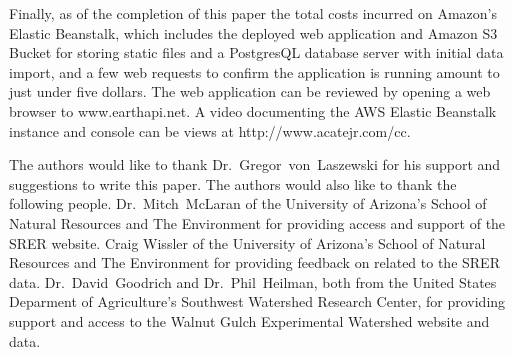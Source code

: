 Finally, as of the completion of this paper the total costs incurred on 
Amazon's Elastic Beanstalk, which includes the deployed web application 
and Amazon S3 Bucket for storing static files and a PostgresQL database 
server with initial data import, and a few web requests to confirm the 
application is running amount to just under five dollars.  The web 
application can be reviewed by opening a web browser to www.earthapi.net.  
A video documenting the AWS Elastic Beanstalk instance and console can be 
views at http://www.acatejr.com/cc.

\begin{acks}
The authors would like to thank Dr.~Gregor~von~Laszewski for his support 
and suggestions to write this paper.  The authors would also like to thank 
the following people.  Dr.~Mitch~McLaran of the University of Arizona's School 
of Natural Resources and The Environment for providing access and support of 
the SRER website.  Craig Wissler of the University of Arizona's School of 
Natural Resources and The Environment for providing feedback on related to the 
SRER data.  Dr.~David~Goodrich and Dr.~Phil~Heilman, both from the United 
States Deparment of Agriculture's Southwest Watershed Research Center, for 
providing support and access to the Walnut Gulch Experimental Watershed 
website and data.
\end{acks}


 
